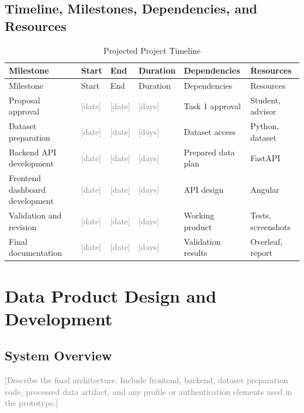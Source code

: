 \documentclass[12pt]{report}
\newcommand{\placeholder}[1]{\textcolor{gray}{[#1]}}
\begin{document}
\section{Timeline, Milestones, Dependencies, and Resources}
\begin{longtable}{p{} p{} p{} p{} p{} p{}}
    \caption{Projected Project Timeline}\\
    \toprule
    Milestone & Start & End & Duration & Dependencies & Resources \\
    \midrule
    \endfirsthead
    \toprule
    Milestone & Start & End & Duration & Dependencies & Resources \\
    \midrule
    \endhead
    Proposal approval & \placeholder{date} & \placeholder{date} & \placeholder{days} & Task 1 approval & Student, advisor \\
    Dataset preparation & \placeholder{date} & \placeholder{date} & \placeholder{days} & Dataset access & Python, dataset \\
    Backend API development & \placeholder{date} & \placeholder{date} & \placeholder{days} & Prepared data plan & FastAPI \\
    Frontend dashboard development & \placeholder{date} & \placeholder{date} & \placeholder{days} & API design & Angular \\
    Validation and revision & \placeholder{date} & \placeholder{date} & \placeholder{days} & Working product & Tests, screenshots \\
    Final documentation & \placeholder{date} & \placeholder{date} & \placeholder{days} & Validation results & Overleaf, report \\
    \bottomrule
\end{longtable}

\chapter{Data Product Design and Development}

\section{System Overview}
\placeholder{Describe the final architecture. Include frontend, backend, dataset preparation code, processed data artifact, and any profile or authentication elements used in the prototype.}
\end{document}
